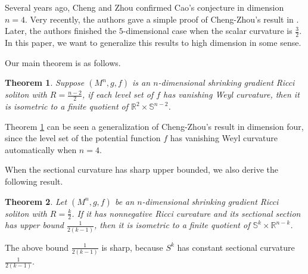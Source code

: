 \documentclass[12pt]{amsart}
\newcommand{\ban}{\begin{eqnarray*}}
\newcommand{\ean}{\end{eqnarray*}}
\newcommand{\Rk}{\noindent {\bf Remark} }
\newtheorem{theo}{Theorem}[section]
\begin{document}
	\smallskip	
	Several years ago, Cheng and Zhou \cite{Cheng-Zhou} confirmed Cao's conjecture in dimension $n=4$.
Very recently, the authors gave a simple proof of Cheng-Zhou's result in \cite{Ou-Qu-Wu}. Later, the authors \cite{Li-Ou-Qu-Wu} finished the $5$-dimensional case when the scalar curvature is $\frac{3}{2}$. In this paper, we want to generalize this results to high dimension in some sense.

	
	
	Our main theorem is as follows.
	\begin{theo}\label{main}
		Suppose $(M^n, g, f)$ is an $n$-dimensional shrinking gradient Ricci soliton with $R=\frac{n-2}{2}$, if each level set of $f$ has vanishing Weyl curvature,  then it is isometric to a finite quotient of $\mathbb{R}^2 \times \mathbb{S}^{n-2}$.
	\end{theo}
\Rk Theorem \ref{main} can be seen a generalization of Cheng-Zhou's result \cite{Cheng-Zhou} in dimension four, since the level set of the potential function $f$ has vanishing Weyl curvature automatically when $n=4$.	


	When the sectional curvature has sharp upper bounded, we also derive the following result.
\begin{theo}\label{theorem2}
Let $(M^n, g, f)$ be an $n$-dimensional shrinking gradient Ricci soliton with $R=\frac{k}{2}$. If it has nonnegative Ricci curvature and its sectional section has upper bound $\frac{1}{2(k-1)}$, then it is isometric to a finite quotient of  $\mathbb{S}^k\times \mathbb{R}^{n-k}$.
\end{theo}
 	
\Rk The above bound $\frac{1}{2(k-1)}$ is sharp, because $S^k$ has constant sectional curvature $\frac{1}{2(k-1)}$.
	
	
	
	\smallskip	
	
\end{document}
